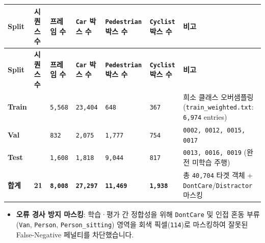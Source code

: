 \documentclass[10.5pt,a4paper]{article}
\begin{document}
\begin{footnotesize}
\setlength{\tabcolsep}{4pt}
\setlength{\LTleft}{0pt}\setlength{\LTright}{0pt}
\begin{longtable}{>{\raggedright\arraybackslash}p{} >{\raggedright\arraybackslash}p{} >{\raggedright\arraybackslash}p{} >{\raggedright\arraybackslash}p{} >{\raggedright\arraybackslash}p{} >{\raggedright\arraybackslash}p{} >{\raggedright\arraybackslash}p{}}
\toprule
\textbf{Split} & \textbf{시퀀스 수} & \textbf{프레임 수} & \textbf{\texttt{Car} 박스 수} & \textbf{\texttt{Pedestrian} 박스 수} & \textbf{\texttt{Cyclist} 박스 수} & \textbf{비고} \\
\midrule
\endfirsthead
\toprule
\textbf{Split} & \textbf{시퀀스 수} & \textbf{프레임 수} & \textbf{\texttt{Car} 박스 수} & \textbf{\texttt{Pedestrian} 박스 수} & \textbf{\texttt{Cyclist} 박스 수} & \textbf{비고} \\
\midrule
\endhead
\bottomrule
\endfoot
\textbf{Train} & 14 & \texttt{5,\allowbreak{}568} & \texttt{23,\allowbreak{}404} & \texttt{648} & \texttt{367} & 희소 클래스 오버샘플링(\texttt{train\_\allowbreak{}weighted.\allowbreak{}txt}: \texttt{6,\allowbreak{}974} entries) \\
\textbf{Val} & 4 & \texttt{832} & \texttt{2,\allowbreak{}075} & \texttt{1,\allowbreak{}777} & \texttt{754} & \texttt{0002,\allowbreak{} 0012,\allowbreak{} 0015,\allowbreak{} 0017} \\
\textbf{Test} & 3 & \texttt{1,\allowbreak{}608} & \texttt{1,\allowbreak{}818} & \texttt{9,\allowbreak{}044} & \texttt{817} & \texttt{0013,\allowbreak{} 0016,\allowbreak{} 0019} (완전 미학습 주행) \\
\textbf{합계} & \textbf{21} & \textbf{\texttt{8,\allowbreak{}008}} & \textbf{\texttt{27,\allowbreak{}297}} & \textbf{\texttt{11,\allowbreak{}469}} & \textbf{\texttt{1,\allowbreak{}938}} & 총 \texttt{40,\allowbreak{}704} 타겟 객체 + \texttt{DontCare}/\texttt{Distractor} 마스킹 \\
\end{longtable}
\end{footnotesize}


\begin{itemize}[leftmargin=1.5em,itemsep=2pt]
\item \textbf{오류 경사 방지 마스킹}: 학습·평가 간 정합성을 위해 \texttt{DontCare} 및 인접 혼동 부류(\texttt{Van}, \texttt{Person}, \texttt{Person\_\allowbreak{}sitting}) 영역을 회색 픽셀(\texttt{114})로 마스킹하여 잘못된 False-Negative 페널티를 차단했습니다.
\end{itemize}
\end{document}
